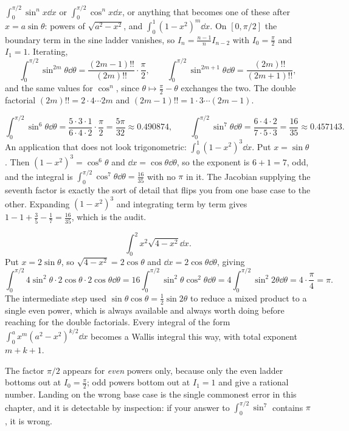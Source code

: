 \cue $\int_0^{\pi/2}\sin^{n}x\dd x$ or $\int_0^{\pi/2}\cos^{n}x\dd x$, or anything that becomes one of these after $x=a\sin\theta$: powers of $\sqrt{a^{2}-x^{2}}$, and $\int_0^1(1-x^{2})^{m}\dd x$.
\method On $[0,\pi/2]$ the boundary term in the sine ladder vanishes, so $I_n=\tfrac{n-1}{n}I_{n-2}$ with $I_0=\tfrac{\pi}{2}$ and $I_1=1$. Iterating,
\[\int_0^{\pi/2}\sin^{2m}\theta\dd\theta=\frac{(2m-1)!!}{(2m)!!}\cdot\frac{\pi}{2},\qquad \int_0^{\pi/2}\sin^{2m+1}\theta\dd\theta=\frac{(2m)!!}{(2m+1)!!},\]
and the same values for $\cos^{n}$, since $\theta\mapsto\tfrac{\pi}{2}-\theta$ exchanges the two. The double factorial $(2m)!!=2\cdot4\cdots2m$ and $(2m-1)!!=1\cdot3\cdots(2m-1)$.

\begin{worked}
\[\int_0^{\pi/2}\sin^{6}\theta\dd\theta=\frac{5\cdot3\cdot1}{6\cdot4\cdot2}\cdot\frac{\pi}{2}=\frac{5\pi}{32}\approx0.490874,\qquad \int_0^{\pi/2}\sin^{7}\theta\dd\theta=\frac{6\cdot4\cdot2}{7\cdot5\cdot3}=\frac{16}{35}\approx0.457143.\]
An application that does not look trigonometric: $\int_0^1(1-x^{2})^{3}\dd x$. Put $x=\sin\theta$. Then $(1-x^{2})^{3}=\cos^{6}\theta$ and $\dd x=\cos\theta\dd\theta$, so the exponent is $6+1=7$, odd, and the integral is $\int_0^{\pi/2}\cos^{7}\theta\dd\theta=\tfrac{16}{35}$ with no $\pi$ in it. The Jacobian supplying the seventh factor is exactly the sort of detail that flips you from one base case to the other. Expanding $(1-x^{2})^{3}$ and integrating term by term gives $1-1+\tfrac35-\tfrac17=\tfrac{16}{35}$, which is the audit.
\end{worked}

\begin{worked}
\[\int_0^{2}x^{2}\sqrt{4-x^{2}}\dd x.\]
Put $x=2\sin\theta$, so $\sqrt{4-x^{2}}=2\cos\theta$ and $\dd x=2\cos\theta\dd\theta$, giving
\[\int_0^{\pi/2}4\sin^{2}\theta\cdot2\cos\theta\cdot2\cos\theta\dd\theta=16\int_0^{\pi/2}\sin^{2}\theta\cos^{2}\theta\dd\theta=4\int_0^{\pi/2}\sin^{2}2\theta\dd\theta=4\cdot\frac{\pi}{4}=\pi.\]
The intermediate step used $\sin\theta\cos\theta=\tfrac12\sin2\theta$ to reduce a mixed product to a single even power, which is always available and always worth doing before reaching for the double factorials. Every integral of the form $\int_0^{a}x^{m}(a^{2}-x^{2})^{k/2}\dd x$ becomes a Wallis integral this way, with total exponent $m+k+1$.
\end{worked}

\begin{trap}
The factor $\pi/2$ appears for \emph{even} powers only, because only the even ladder bottoms out at $I_0=\tfrac{\pi}{2}$; odd powers bottom out at $I_1=1$ and give a rational number. Landing on the wrong base case is the single commonest error in this chapter, and it is detectable by inspection: if your answer to $\int_0^{\pi/2}\sin^{7}$ contains $\pi$, it is wrong.
\end{trap}

